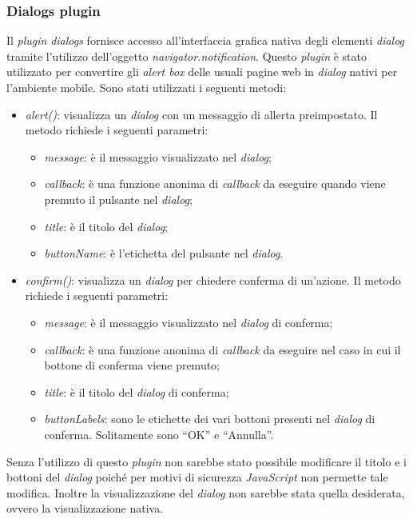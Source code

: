 \subsubsection{Dialogs plugin}

Il \textit{plugin} \textit{dialogs} fornisce accesso all'interfaccia grafica nativa degli elementi \textit{dialog} tramite l'utilizzo dell'oggetto \textit{navigator.notification}. Questo \textit{plugin} è stato utilizzato per convertire gli \textit{alert box} delle usuali pagine web in \textit{dialog} nativi per l'ambiente mobile. Sono stati utilizzati i seguenti metodi:
\begin{itemize}
	\item \textit{alert()}: visualizza un \textit{dialog} con un messaggio di allerta preimpostato. Il metodo richiede i seguenti parametri:
	\begin{itemize}
		\item \textit{message}: è il messaggio visualizzato nel \textit{dialog};
		\item \textit{callback}: è una funzione anonima di \textit{callback} da eseguire quando viene premuto il pulsante nel \textit{dialog};
		\item \textit{title}: è il titolo del \textit{dialog};
		\item \textit{buttonName}: è l'etichetta del pulsante nel \textit{dialog}.
	\end{itemize}
	\item \textit{confirm()}: visualizza un \textit{dialog} per chiedere conferma di un'azione. Il metodo richiede i seguenti parametri:
	\begin{itemize}
		\item \textit{message}: è il messaggio visualizzato nel \textit{dialog} di conferma;
		\item \textit{callback}: è una funzione anonima di \textit{callback} da eseguire nel caso in cui il bottone di conferma viene premuto;
		\item \textit{title}: è il titolo del \textit{dialog} di conferma;
		\item \textit{buttonLabels}: sono le etichette dei vari bottoni presenti nel \textit{dialog} di conferma. Solitamente sono ``OK'' e ``Annulla''.
	\end{itemize}
\end{itemize}

Senza l'utilizzo di questo \textit{plugin} non sarebbe stato possibile modificare il titolo e i bottoni del \textit{dialog} poiché per motivi di sicurezza \textit{JavaScript} non permette tale modifica. Inoltre la visualizzazione del \textit{dialog} non sarebbe stata quella desiderata, ovvero la visualizzazione nativa. 

